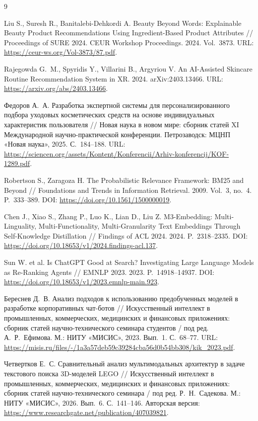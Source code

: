 \documentclass{misisarticle}
\begin{document}
\begin{thebibliography}{9}

Liu S., Suresh R., Banitalebi-Dehkordi A.
Beauty Beyond Words: Explainable Beauty Product Recommendations Using Ingredient-Based Product Attributes // Proceedings of SURE 2024. CEUR Workshop Proceedings. 2024. Vol.~3873.
URL: \url{https://ceur-ws.org/Vol-3873/87.pdf}.

Rajegowda G.~M., Spyridis Y., Villarini B., Argyriou V.
An AI-Assisted Skincare Routine Recommendation System in XR. 2024. arXiv:2403.13466.
URL: \url{https://arxiv.org/abs/2403.13466}.

Федоров А.~А. Разработка экспертной системы для персонализированного подбора уходовых косметических средств на основе индивидуальных характеристик пользователя // Новая наука в новом мире: сборник статей XI Международной научно-практической конференции. Петрозаводск: МЦНП «Новая наука», 2025. С.~184--188.
URL: \url{https://sciencen.org/assets/Kontent/Konferencii/Arhiv-konferencij/KOF-1289.pdf}.

Robertson S., Zaragoza H. The Probabilistic Relevance Framework: BM25 and Beyond // Foundations and Trends in Information Retrieval. 2009. Vol.~3, no.~4. P.~333--389.
DOI: \url{https://doi.org/10.1561/1500000019}.

Chen J., Xiao S., Zhang P., Luo K., Lian D., Liu Z.
M3-Embedding: Multi-Linguality, Multi-Functionality, Multi-Granularity Text Embeddings Through Self-Knowledge Distillation // Findings of ACL 2024. 2024. P.~2318--2335.
DOI: \url{https://doi.org/10.18653/v1/2024.findings-acl.137}.

Sun W. et al. Is ChatGPT Good at Search? Investigating Large Language Models as Re-Ranking Agents // EMNLP 2023. 2023. P.~14918--14937.
DOI: \url{https://doi.org/10.18653/v1/2023.emnlp-main.923}.

Береснев Д.~В. Анализ подходов к использованию предобученных моделей в разработке корпоративных чат-ботов // Искусственный интеллект в промышленных, коммерческих, медицинских и финансовых приложениях: сборник статей научно-технического семинара студентов / под ред. А.~Р.~Ефимова. М.: НИТУ «МИСИС», 2023. Вып.~1. С.~68--77.
URL: \url{https://misis.ru/files/-/1a3a57deb59c39284cba56d0b54bb308/kik_2023.pdf}.

Четвертков Е.~С. Сравнительный анализ мультимодальных архитектур в задаче текстового поиска 3D-моделей LEGO // Искусственный интеллект в промышленных, коммерческих, медицинских и финансовых приложениях: сборник статей научно-технического семинара / под ред. Р.~Н.~Садекова. М.: НИТУ «МИСИС», 2026. Вып.~6. С.~141--146.
Авторская версия: \url{https://www.researchgate.net/publication/407039821}. 
\end{thebibliography}
\end{document}
